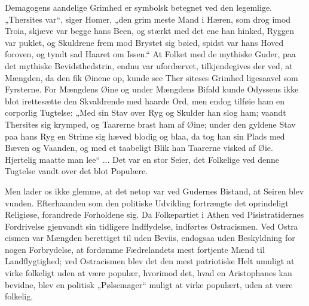 \documentclass[12pt]{book}
\newcommand{\opage}[1]{\marginnote{\footnotesize\textit{[#1]}}}
\begin{document}
Demagogens aandelige Grimhed er symbolsk betegnet
ved den legemlige. „Thersites var“, siger Homer, „den grim\-%
meste Mand i Hæren, som drog imod Troia, skjæve var begge
hans Been, og stærkt med det ene han hinked, Ryggen var
puklet, og Skuldrene frem mod Brystet sig bøied, spidst
var hans Hoved foroven, og tyndt sad Haaret om Issen.“
At Folket med de mythiske Guder, paa det mythiske
Bevidsthedstrin, endnu var ufordærvet, tilkjendegives der\-%
ved, at Mængden, da den fik Øinene op, kunde see Ther\-%
siteses Grimhed ligesaavel som Fyrsterne. For Mængdens
Øine og under Mængdens Bifald kunde Odysseus ikke
blot irettesætte den Skvaldrende med haarde Ord, men
endog tilføie ham en corporlig Tugtelse: „Med sin Stav
over Ryg og Skulder han slog ham; vaandt Thersites
sig krymped, og Taarerne brast ham af Øine; under den
gyldene Stav paa hans Ryg en Strime sig hæved blodig
og blaa, da tog han sin Plads med Bæven og Vaanden,
og med et taabeligt Blik han Taarerne visked af Øie.
Hjertelig maatte man lee“ ... Det var en stor Seier, det
Folkelige ved denne Tugtelse vandt over det blot
Populære.

Men lader os ikke glemme, at det netop var ved
Gudernes Bistand, at Seiren blev vunden. Efterhaanden
\opage{132}\setcounter{footnote}{0}%
som den politiske Udvikling fortrængte det oprindeligt
Religiøse, forandrede Forholdene sig. Da Folkepartiet
i Athen ved Pisistratidernes Fordrivelse gjenvandt sin
tidligere Indflydelse, indførtes Ostracismen. Ved Ostra\-%
cismen var Mængden berettiget til uden Beviis, endogsaa
uden Beskyldning for nogen Forbrydelse, at fordømme
Fædrelandets mest fortjente Mænd til Landflygtighed;
ved Ostracismen blev det den mest patriotiske Helt
umuligt at virke folkeligt uden at være populær, hvorimod
det, hvad en Aristophanes kan bevidne, blev en politisk
„Pølsemager“ muligt at virke populært, uden at være
folkelig.
\end{document}
